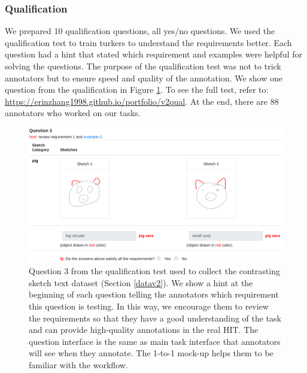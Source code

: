\subsubsection{Qualification}
We prepared 10 qualification questions, all yes/no questions.
We used the qualification test to train turkers to understand the requirements better. 
Each question had a hint that stated which requirement and examples were helpful for solving the questions. The purpose of the qualification test was not to trick annotators but to ensure speed and quality of the annotation. 
We show one question from the qualification in Figure \ref{v2.qualification.1}. 
To see the full test, refer to: \url{https://erinzhang1998.github.io/portfolio/v2qual}. 
At the end, there are 88 annotators who worked on our tasks. 

\begin{figure}[!htb]
\centering
\includegraphics[width=\linewidth]{data_collection/version2/v2qualQ3.png}  
\caption{Question 3 from the qualification test used to collect the contrasting sketch text dataset (Section \ref{datav2}). We show a hint at the beginning of each question telling the annotators which requirement this question is testing. In this way, we encourage them to review the requirements so that they have a good understanding of the task and can provide high-quality annotations in the real HIT. The question interface is the same as main task interface that annotators will see when they annotate. The 1-to-1 mock-up helps them to be familiar with the workflow.}
\label{v2.qualification.1}
\end{figure}

